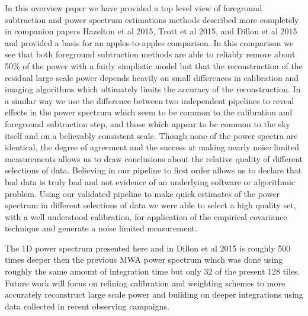 \documentclass[preprint2]{aastex}
\def\chipscite{Trott et al 2015}
\def\eppsiloncite{Hazelton et al 2015}
\def\dilloncite{Dillon et al 2015 }
\begin{document}
In this overview paper we have provided a top level view of foreground subtraction and power spectrum estimations methods described more completely in companion papers \eppsiloncite{}, \chipscite{}, and \dilloncite{} and provided a basis for an apples-to-apples comparison.  In this comparison we see that both foreground subtraction methods are able to reliably remove about 50\% of the power with a fairly simplistic model but that the reconstruction of the residual large scale power depends heavily on small differences in calibration and imaging algorithms which ultimately limits the accuracy of the reconstruction.  In a similar way we use the difference between two independent pipelines to reveal effects in the power spectrum which seem to be common to the calibration and foreground subtraction step, and those which appear to be common to the sky itself and on a believably consistent scale.  Though none of the power spectra are identical, the degree of agreement and the success at making nearly noise limited measurements allows us to draw conclusions about the relative quality of different selections of data. Believing in our pipeline to first order allows us to declare that bad data is truly bad and not evidence of an underlying software or algorithmic problem.  Using our validated pipeline to make quick estimates of the power spectrum in different selections of data we were able to select a high quality set, with a well understood calibration, for application of the empirical  covariance technique and generate a noise limited measurement. 

The 1D power spectrum presented here and in \dilloncite{} is roughly 500 times deeper then the previous MWA power spectrum \citep{Dillon:2014p9788} which was done using roughly the same amount of integration time but only 32 of the present 128 tiles.  Future work will focus on refining calibration and weighting schemes to more accurately reconstruct large scale power and building on deeper integrations using data collected in recent observing campaigns.




\acknowledgments
\end{document}
